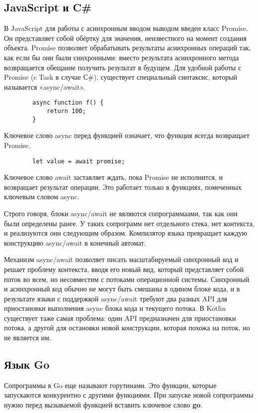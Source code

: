 	\subsection{JavaScript и C\#}
	В JavaScript для работы с асинхронным вводом выводом введен класс Promise.
	Он представляет собой обёртку для значения, неизвестного на момент создания объекта. 
	Promise позволяет обрабатывать результаты асинхронных операций так, как если бы они были синхронными:
	вместо результата асинхронного метода возвращается обещание получить результат в будущем.
	Для удобной работы с Promise (c Task в случае С\#), существует специальный синтаксис, который называется «async/await». 
	
	\begin{lstlisting}
		async function f() {
			return 100;
		}
	\end{lstlisting}

	Ключевое слово async перед функцией означает, что функция всегда возвращает Promise.
	
	\begin{lstlisting}
		let value = await promise;
	\end{lstlisting}
	Ключевое слово await заставляет ждать, пока Promise не исполнится, и возвращает результат операции. Это работает только в функциях, помеченных ключевым словом async. 
	\par
	Строго говоря, блоки async/await не являются сопрограммаами, так как они были определены ранее. У таких сопрограмм нет отдельного
	стека, нет контекста, и реализуются они следующим образом. Компилятор языка превращает каждую конструкцию async/await
	в конечный автомат.
	
	Механизм async/await позволяет писать масштабируемый синхронный код и решает проблему контекста, вводя
	его	новый вид, который представляет собой поток во всем, но несовместим с потоками операционной
	системы. Синхронный и асинхронный код обычно не могут быть смешаны в одином блоке кода, и в
	результате языки с поддержкой async/await требуют два разных API для приостановки выполнения async
	блока кода и текущего потока. В Kotlin существует таже самая проблема: один API предназначен для
	приостановки потока, а другой для остановки новой конструкции, которая похожа на поток, но не
	является им.
	
	\subsection{Язык Go}
	Сопрограммы в Go еще называют горутинами. Это функции, которые запускаются конкурентно с другими функциями. 
	При запуске новой сопрограммы нужно перед вызываемой функцией вставить ключевое слово \textbf{go}.
	
